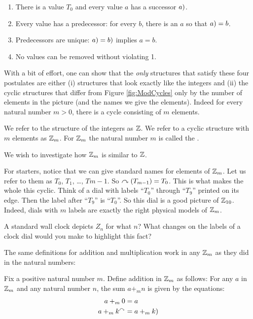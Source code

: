 \begin{enumerate}
	\item There is a value $T_0$ and every value $a$ has a successor $\next(a)$.
	\item Every value has a predecessor: for every $b$, there is an $a$ so that $\next(a) = b$.
	\item Predecessors are unique: $\next(a) = \next(b)$ implies $a=b$.
	\item No values can be removed without violating 1.
\end{enumerate}

With a bit of effort, one can show that the \emph{only} structures that satisfy these four postulates are either (i) structures that look exactly like the integers and (ii) the cyclic structures that differ from Figure \ref{fig:ModCycles} only by the number of elements in the picture (and the names we give the elements). Indeed for every natural number $m>0$, there is a cycle consisting of $m$ elements.

\begin{defn}
	We refer to the structure of the integers as ${\mathbb Z}$. We refer to a cyclic structure with $m$ elements as ${\mathbb Z}_m$. For ${\mathbb Z}_m$ the natural number $m$ is called the .
\end{defn}

We wish to investigate how ${\mathbb Z}_m$ is similar to ${\mathbb Z}$. 

For starters, notice that we can give standard names for elements of ${\mathbb Z}_m$. Let us refer to them as $T_0$, $T_1$, \ldots, $T{m-1}$. So $\curvearrowright(T_{m-1}) = T_0$. This is what makes the whole this cyclic.
Think of a dial with labels ``$T_0$'' through ``$T_9$'' printed on its edge. Then the label after ``$T_9$'' is ``$T_0$''. So this dial is a good picture of ${\mathbb Z}_{10}$. Indeed, dials with $m$ labels are exactly the right physical models of ${\mathbb Z}_m$. 

\begin{exer}
	\begin{exercise}
		\item A standard wall clock depicts $Z_n$ for what $n$? What changes on the labels of a clock dial would you make to highlight this fact?
	\end{exercise}
\end{exer}   

The same definitions for addition and multiplication work in any ${\mathbb Z}_m$ as they did in the natural numbers:

\begin{defn}
	Fix a positive natural number $m$. Define addition in ${\mathbb Z}_m$ as follows: For any $a$ in ${\mathbb Z}_m$ and any natural number $n$, the sum $a+_m n$ is given by the equations:
	\begin{align*}
		a +_m 0 &= a\\
		a +_m k^\nxt &= \next(a+_m k)
	\end{align*}
\end{defn}

